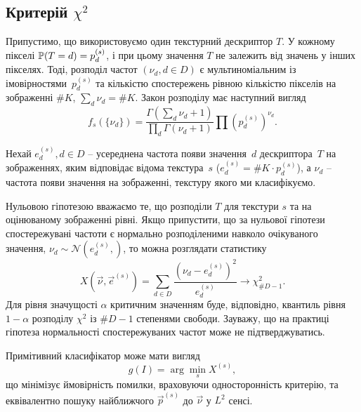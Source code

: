 \subsection{Критерій $\chi^2$}\label{section1.3a}\hfill

Припустимо, що використовуємо один текстурний дескриптор $T$.
У кожному пікселі $\P(T = d) = p^{(s)}_d$, і при цьому значення $T$ не залежить від значень у інших пікселях.
Тоді, розподіл частот $\left(\nu_d, d\in D\right)$ є мультиноміальним із імовірностями~$p^{(s)}_d$ та 
кількістю спостережень рівною кількістю пікселів на зображенні $\# K$, $\sum_{d}\nu_d = \# K$. 
Закон розподілу має наступний вигляд
\begin{equation*}
    f_s(\{ \nu_d \}) = \frac {\Gamma (\sum_{d}\nu_{d}+1)}{\prod_{d}\Gamma (\nu_{d}+1)} \prod (p^{(s)}_d)^{\nu_d}.
\end{equation*}

Нехай $e^{(s)}_d, d \in D$ -- усереднена частота появи значення~$d$ дескриптора~$T$ на зображеннях, яким відповідає відома текстура~$s$
($e^{(s)}_d = \# K \cdot p^{(s)}_d$), а $\nu_d$ -- частота появи значення на зображенні, текстуру якого ми класифікуємо.

Нульовою гіпотезою вважаємо те, що розподіли $T$ для текстури $s$ та на оцінюваному зображенні рівні.
Якщо припустити, що за нульової гіпотези спостережувані частоти є нормально розподіленими навколо очікуваного значення, $\nu_d \sim \mathcal N(e^{(s)}_d, )$, то можна розглядати статистику
\begin{equation*}\label{e:chi2crit}
    X(\vec \nu,\vec e^{(s)}) = \sum_{d \in D} \frac{\left(\nu_d - e^{(s)}_d\right)^2}{e^{(s)}_d} \longrightarrow \chi^2_{\# D - 1}.
\end{equation*}
Для рівня значущості $\alpha$ критичним значенням буде, відповідно, квантиль рівня $1-\alpha$ розподілу $\chi^2$ із $\# D - 1$ степенями свободи.
Зауважу, що на практиці гіпотеза нормальності спостережуваних частот може не підтверджуватись.

Примітивний класифікатор може мати вигляд
\begin{equation*}\label{e:chi2classifier}
    g(I) = \arg \min_{s} X^{(s)},
\end{equation*} 
що мінімізує ймовірність помилки, враховуючи односторонність критерію, та еквівалентно пошуку найближчого $\vec p^{(s)}$ до $\vec \nu$ у $L^2$ сенсі.

